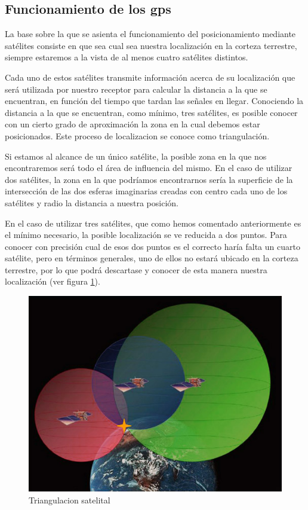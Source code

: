 \subsection{Funcionamiento de los gps}

La base sobre la que se asienta el funcionamiento del posicionamiento mediante satélites consiste en que sea cual sea nuestra localización en la corteza terrestre, siempre estaremos a la vista de al menos cuatro satélites distintos.

Cada uno de estos satélites transmite información acerca de su localización que será utilizada por nuestro receptor para calcular la distancia a la que se encuentran, en función del tiempo que tardan las señales en llegar.
Conociendo la distancia a la que se encuentran, como mínimo, tres satélites, es posible conocer con un cierto grado de aproximación la zona en la cual debemos estar posicionados. Este proceso de localizacion se conoce como triangulación.

Si estamos al alcance de un único satélite, la posible zona en la que nos encontraremos será todo el área de influencia del mismo. En el caso de utilizar dos satélites, la zona en la que podríamos encontrarnos sería la superficie de la intersección de las dos esferas imaginarias creadas con centro cada uno de los satélites y radio la distancia a nuestra posición.

En el caso de utilizar tres satélites, que como hemos comentado anteriormente es el mínimo necesario, la posible localización se ve reducida a dos puntos. Para conocer con precisión cual de esos dos puntos es el correcto haría falta un cuarto satélite, pero en términos generales, uno de ellos no estará ubicado en la corteza terrestre, por lo que podrá descartase y conocer de esta manera nuestra localización (ver figura \ref{fig:triangulacion-satelital}).

\begin{figure}[h!btp]
\centering
\includegraphics[scale=0.5, fbox={\fboxrule} 0mm]{images/03-antecedentes/31-funcionamiento_gps.jpg}
\caption{Triangulacion satelital}
\label{fig:triangulacion-satelital}
\end{figure}

